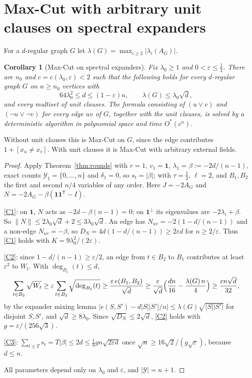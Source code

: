 \documentclass[11pt,a4paper]{article}
\newtheorem{corollary}[theorem]{Corollary}
\theoremstyle{definition}
\theoremstyle{remark}
\newcommand{\Ostar}{O^{*}}
\newcommand{\one}{\mathbf 1}
\begin{document}
\section{Max-Cut with arbitrary unit clauses on spectral expanders}
\label{sec:maxcut}

For a $d$-regular graph $G$ let $\lambda(G)=\max_{i\ge2}|\lambda_i(A_G)|$.

\begin{corollary}[Max-Cut on spectral expanders]\label{cor:maxcut}
Fix $\lambda_0\ge1$ and $0<\varepsilon\le\frac12$. There are $n_0$ and
$c=c(\lambda_0,\varepsilon)<2$ such that the following holds for every
$d$-regular graph $G$ on $n\ge n_0$ vertices with
\[
 64\lambda_0^2\le d\le(1-\varepsilon)n,\qquad \lambda(G)\le\lambda_0\sqrt d,
\]
and every multiset of unit clauses. The formula consisting of $(u\lor v)$ and
$(\neg u\lor\neg v)$ for every edge $uv$ of $G$, together with the unit clauses,
is solved by a deterministic algorithm in polynomial space and time
$\Ostar(c^n)$.
\end{corollary}

Without unit clauses this is Max-Cut on $G$, since the edge contributes
$1+[x_u\ne x_v]$. With unit clauses it is Max-Cut with arbitrary external fields.

\begin{proof}
Apply Theorem~\ref{thm:rounds} with $r=1$, $v_1=\one$, $\lambda_1=\beta:=-2d/(n-1)$,
exact counts $\mathcal Y_1=\{0,\dots,n\}$ and $\delta_1=0$, so $s_t=|\beta|$; with
$\tau=\frac12$, $\ell=2$, and $B_1,B_2$ the first and second $n/4$ variables of
any order. Here $J=-2A_G$ and $N=-2A_G-\beta(\one\one^{\mathsf T}-I)$.

\eqref{C1}: on $\one$, $N$ acts as $-2d-\beta(n-1)=0$; on $\one^\perp$ its
eigenvalues are $-2\lambda_i+\beta$. So $\|N\|\le2\lambda_0\sqrt d+2\le
3\lambda_0\sqrt d$. An edge has $N_{uv}=-2(1-d/(n-1))$ and a non-edge
$N_{uv}=-\beta$, so $D_N=4d(1-d/(n-1))\ge2\varepsilon d$ for $n\ge2/\varepsilon$.
Thus \eqref{C1} holds with $K=9\lambda_0^2/(2\varepsilon)$.

\eqref{C2}: since $1-d/(n-1)\ge\varepsilon/2$, an edge from $t\in B_2$ to $B_1$
contributes at least $\varepsilon^2$ to $W_t$. With $\deg_{B_1}(t)\le d$,
\[
 \sum_{t\in B_2}\sqrt{W_t}\ge\varepsilon\sum_{t\in B_2}\sqrt{\deg_{B_1}(t)}
 \ge\frac{\varepsilon\,e(B_1,B_2)}{\sqrt d}
 \ge\frac\varepsilon{\sqrt d}\Bigl(\frac{dn}{16}-\frac{\lambda(G)\,n}4\Bigr)
 \ge\frac{\varepsilon n\sqrt d}{32},
\]
by the expander mixing lemma
$|e(S,S')-d|S||S'|/n|\le\lambda(G)\sqrt{|S||S'|}$ for disjoint $S,S'$, and
$\sqrt d\ge8\lambda_0$. Since $\sqrt{D_N}\le2\sqrt d$, \eqref{C2} holds with
$g=\varepsilon/(256\sqrt3)$.

\eqref{C3}: $\sum_{t\le T}s_t=T|\beta|\le2d\le\frac18gn\sqrt{2\varepsilon d}$
once $\sqrt n\ge16\sqrt2/(g\sqrt\varepsilon)$, because $d\le n$.

All parameters depend only on $\lambda_0$ and $\varepsilon$, and $|\mathcal Y|=n+1$.
\end{proof}
\end{document}
